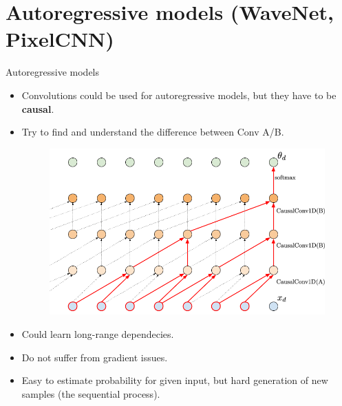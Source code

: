 \section{Autoregressive models (WaveNet, PixelCNN)}
\begin{frame}{Autoregressive models}
	\begin{itemize}
		\item Convolutions could be used for autoregressive models, but they have to be \textbf{causal}. \\
		\item Try to find and understand the difference between Conv A/B.
		\begin{figure}
			\centering
			\includegraphics[width=0.7\linewidth]{figs/sequential_CNN}
		\end{figure}
		\item Could learn long-range dependecies.
		\item Do not suffer from gradient issues.
		\item Easy to estimate probability for given input, but hard generation of new samples (the sequential process).
	\end{itemize}
\end{frame}
